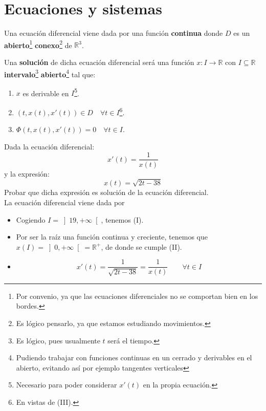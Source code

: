 \newpage
\chapter{Ecuaciones y sistemas}

\begin{definicion}
    Una ecuación diferencial viene dada por una función
    \textbf{continua} donde $D$ es un \textbf{abierto}\footnote{Por convenio, ya que las ecuaciones diferenciales no se comportan bien en los bordes.} \textbf{conexo}\footnote{Es lógico pensarlo, ya que estamos estudiando movimientos.} de $\mathbb{R}^3$.

\noindent
Una \textbf{solución} de dicha ecuación diferencial será una función $x:I\rightarrow\mathbb{R}$ con $I\subseteq \mathbb{R}$ \textbf{intervalo}\footnote{Es lógico, pues usualmente $t$ será el tiempo.} \textbf{abierto}\footnote{Pudiendo trabajar con funciones continuas en un cerrado y derivables en el abierto, evitando así por ejemplo tangentes verticales} tal que:
\begin{enumerate}[label= (\roman*)]
    \item $x$ es derivable en $I$\footnote{Necesario para poder considerar $x'(t)$ en la propia ecuación.}.
    \item $(t,x(t),x'(t)) \in D \quad\forall t\in I$\footnote{En vistas de (III).}.
    \item $\Phi(t,x(t),x'(t))=0 \quad \forall t\in I$.
\end{enumerate}
\end{definicion}

\begin{ejemplo}
    Dada la ecuación diferencial:
    \begin{equation*}
        x'(t) = \dfrac{1}{x(t)}
    \end{equation*}
    y la expresión:
    \begin{equation*}
        x(t) = \sqrt{2t-38}
    \end{equation*}
    Probar que dicha expresión es solución de la ecuación diferencial.\\

    La ecuación diferencial viene dada por
    \begin{itemize}
        \item Cogiendo $I = \left]19, +\infty\right[$, tenemos (I).
        \item Por ser la raíz una función continua y creciente, tenemos que ${x(I) = \left]0,+\infty\right[=\mathbb{R}^+}$, de donde se cumple (II).
        \item 
            \begin{equation*}
                x'(t) = \dfrac{1}{\sqrt{2t-38}} = \dfrac{1}{x(t)} \qquad \forall t\in I
            \end{equation*}
    \end{itemize}
\end{ejemplo}

